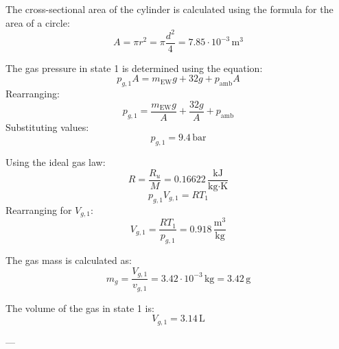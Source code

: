The cross-sectional area of the cylinder is calculated using the formula for the area of a circle:  
\[
A = \pi r^2 = \pi \frac{d^2}{4} = 7.85 \cdot 10^{-3} \, \text{m}^3
\]  

The gas pressure in state 1 is determined using the equation:  
\[
p_{g,1} A = m_{\text{EW}} g + 32 g + p_{\text{amb}} A
\]  
Rearranging:  
\[
p_{g,1} = \frac{m_{\text{EW}} g}{A} + \frac{32 g}{A} + p_{\text{amb}}
\]  
Substituting values:  
\[
p_{g,1} = 9.4 \, \text{bar}
\]  

Using the ideal gas law:  
\[
R = \frac{R_u}{M} = 0.16622 \, \frac{\text{kJ}}{\text{kg·K}}
\]  
\[
p_{g,1} V_{g,1} = R T_1
\]  
Rearranging for \( V_{g,1} \):  
\[
V_{g,1} = \frac{R T_1}{p_{g,1}} = 0.918 \, \frac{\text{m}^3}{\text{kg}}
\]  

The gas mass is calculated as:  
\[
m_g = \frac{V_{g,1}}{v_{g,1}} = 3.42 \cdot 10^{-3} \, \text{kg} = 3.42 \, \text{g}
\]  

The volume of the gas in state 1 is:  
\[
V_{g,1} = 3.14 \, \text{L}
\]  

---